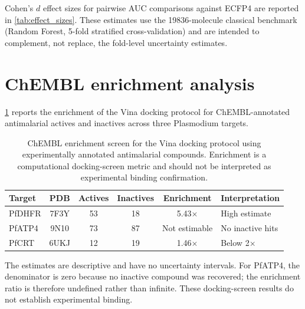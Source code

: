 \documentclass[11pt,a4paper]{article}
\begin{document}
Cohen's $d$ effect sizes for pairwise AUC comparisons against ECFP4 are reported in \cref{tab:effect_sizes}. These estimates use the \num{19836}-molecule classical benchmark (Random Forest, 5-fold stratified cross-validation) and are intended to complement, not replace, the fold-level uncertainty estimates.





\section{ChEMBL enrichment analysis}
\label{sec:chembl_enrichment}

\cref{tab:chembl_enrichment} reports the enrichment of the Vina docking protocol for ChEMBL-annotated antimalarial actives and inactives across three Plasmodium targets.

\begin{table}[htbp]
\centering
\caption{ChEMBL enrichment screen for the Vina docking protocol using experimentally annotated antimalarial compounds. Enrichment is a computational docking-screen metric and should not be interpreted as experimental binding confirmation.}
\label{tab:chembl_enrichment}
\begin{tabularx}{\textwidth}{l c c c c l}
\toprule
Target & PDB & {Actives} & {Inactives} & {Enrichment} & Interpretation \\
\midrule
PfDHFR & 7F3Y & 53 & 18 & 5.43$\times$ & High estimate \\
PfATP4 & 9N10 & 73 & 87 & Not estimable & No inactive hits \\
PfCRT & 6UKJ & 12 & 19 & 1.46$\times$ & Below 2$\times$ \\
\bottomrule
\end{tabularx}
\vspace{1mm}
\footnotesize The estimates are descriptive and have no uncertainty intervals. For PfATP4, the denominator is zero because no inactive compound was recovered; the enrichment ratio is therefore undefined rather than infinite. These docking-screen results do not establish experimental binding.
\end{table}



\end{document}

